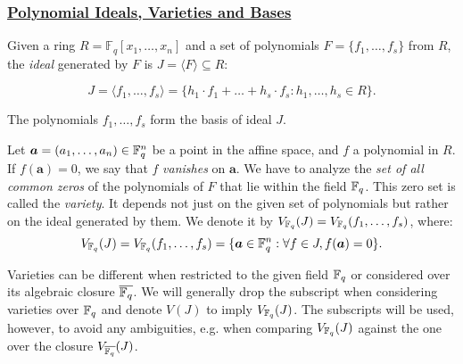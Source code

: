 \vspace{0.075in}
\subsubsection{\underline{Polynomial Ideals, Varieties and \Grobner
    Bases}}

\begin{Definition}
Given a ring $R=\mathbb{F}_q[x_1,\dots, x_n]$ and a set of polynomials
$F=\{f_1,\dots,f_s\}$ from $R$, the {\it ideal} generated by $F$ is $J =
\langle F \rangle \subseteq R$: 
\vspace{-0.2in}

{\small
\begin{equation}
J = \langle f_1, \dots, f_s \rangle = \{ h_1\cdot f_1 + \dots+h_s\cdot
f_s:  h_1,\dots,h_s\in R\}.
\end{equation}
}
\vspace{-0.2in}

The polynomials $f_1,\dots,f_s$ form the basis of ideal $J$.
\end{Definition}

Let $\bm{a} = (a_1,\dots,a_n) \in {\mathbb{F}}_{q}^n$ be a point in the affine
space, and $f$ a polynomial in $R$. If $f(\bm{a}) = 0$, we say
that $f$ {\it vanishes} on $\bm{a}$. We have to
analyze the {\it set of all common zeros} of the polynomials of $F$
that lie %
within the field ${\mathbb{F}}_{q}$. This zero set is called the {\it variety}. It
depends not just on the given set of polynomials but rather on the
ideal generated by them. We denote it by $V_{{\mathbb{F}}_{q}}(J) =
V_{{\mathbb{F}}_{q}}(f_1,\dots,f_s)$, where: 
$$V_{{\mathbb{F}}_{q}}(J) = V_{{\mathbb{F}}_{q}}(f_1, \dots, f_s) = \{\bm{a} \in {\mathbb{F}}_{q}^n: \forall
f \in J, f(\bm{a}) = 0\}.$$

Varieties can be different when restricted to the given field ${\mathbb{F}}_{q}$
or considered over its algebraic closure ${\overline{{\mathbb{F}}_q}}$. We will generally
drop the subscript when considering varieties over ${\mathbb{F}}_{q}$ and
denote $V(J)$ to imply $V_{{\mathbb{F}}_{q}}(J)$. The subscripts will be used,
however, to avoid any ambiguities, e.g. when comparing $V_{{\mathbb{F}}_{q}}(J)$
against the one over the closure $V_{{\overline{{\mathbb{F}}_q}}}(J)$. 




